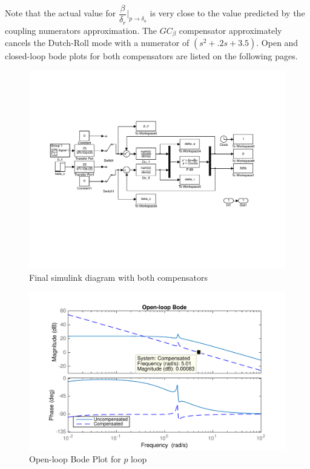 \documentclass[11pt]{article}
\begin{document}
\noindent Note that the actual value for $\dfrac{\beta}{\delta_r}\biggr\rvert_{p \rightarrow \delta_a}$ is very close to the value predicted by the coupling numerators approximation. The $GC_{\beta}$ compensator approximately cancels the Dutch-Roll mode with a numerator of $(s^2 + .2s + 3.5)$. Open and closed-loop bode plots for both compensators are listed on the following pages.

\begin{figure}
\begin{center}
\includegraphics[width=1\textwidth]{figures/simulink}
\caption{Final simulink diagram with both compensators}
\end{center}
\end{figure}

\clearpage
\begin{figure}[h!]
\begin{center}
\includegraphics[height=.4\textheight]{figures/openloop_p}
\caption{Open-loop Bode Plot for $p$ loop}
\end{center}
\end{figure}
\end{document}
